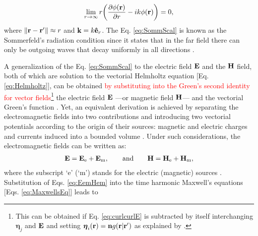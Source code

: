 %
%
%
%
\begin{align}
    \lim_{r\to \infty} r\qty(\pdv{\phi(\vb{r})}{r} - ik\phi(\vb{r})) = 0,
    \label{eq:SommScal}
\end{align}
%
where $\norm{\vb{r}-\vb{r}'} \approx r$ and $\vb{k} = k \vu{e}_r$. The Eq. \eqref{eq:SommScal} is known as the Sommerfeld's radiation condition since it states that in the far field there can only be outgoing waves that decay uniformly in all directions \cite{schot_eighty_1992,jin_theory_2010,bondeson_computational_2005}.

A generalization of the Eq. \eqref{eq:SommScal} to the electric field $\vb{E}$ and the $\vb{H}$ field, both of which are solution to the vectorial Helmholtz equation [Eq. \eqref{eq:Helmholtz}], can be obtained \textcolor{red}{by substituting into the Green's second identity for vector fields\footnote{%
    This can be obtained if  Eq. \eqref{eq:curlcurlE} is subtracted by itself interchanging $\boldsymbol{\eta}_j $ and $\vb{E}$ and setting $\boldsymbol{\eta}_i(\vb{r}) = \vb{n}g(\vb{r}|\vb{r}')$ as explained by \citeauthor{stratton_diffraction_1939} \cite{stratton_diffraction_1939}.}%
    } the electric field  $\vb{E}$ ---or magnetic field $\vb{H}$--- and the vectorial Green's function \cite{schot_eighty_1992,silver_microwave_1984,colton_inverse_2019}. Yet, an equivalent derivation is achieved by separating the electromagnetic fields into two contributions and introducing  two vectorial potentials according to the origin of their sources: magnetic and electric  charges and currents induced into a bounded volume \cite{jin_theory_2010,bondeson_computational_2005}. Under such considerations, the electromagnetic fields can be written as:
%
\begin{align}
\vb{E} = \vb{E}_\text{e} + \vb{E}_\text{m},
    \qquad
    \text{and}
    \qquad
\vb{H} = \vb{H}_\text{e} + \vb{H}_\text{m},
\label{eq:EemHem}
\end{align}
%
where the subscript `e' (`m') stands for the electric (magnetic) sources \cite{jin_theory_2010}. Substitution of Eqs. \eqref{eq:EemHem} into the time harmonic Maxwell's equations [Eqs. \eqref{eq:MaxwellsEq}] leads to
%
%
%
